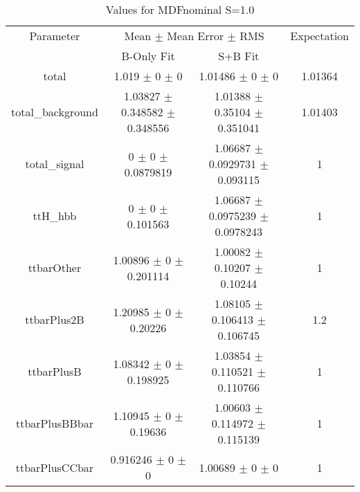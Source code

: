 \begin{table}
\centering
\caption{Values for MDFnominal S=1.0}
\begin{tabular}{cccc}
\toprule
Parameter & \multicolumn{2}{c}{Mean $\pm$ Mean Error $\pm$ RMS} & Expectation\\
 & B-Only Fit & S+B Fit & \\
\midrule
total & \num{1.019} $\pm$ \num{0} $\pm$ \num{0} & \num{1.01486} $\pm$ \num{0} $\pm$ \num{0} & \num{1.01364}\\
total\_background & \num{1.03827} $\pm$ \num{0.348582} $\pm$ \num{0.348556} & \num{1.01388} $\pm$ \num{0.35104} $\pm$ \num{0.351041} & \num{1.01403}\\
total\_signal & \num{0} $\pm$ \num{0} $\pm$ \num{0.0879819} & \num{1.06687} $\pm$ \num{0.0929731} $\pm$ \num{0.093115} & \num{1}\\
ttH\_hbb & \num{0} $\pm$ \num{0} $\pm$ \num{0.101563} & \num{1.06687} $\pm$ \num{0.0975239} $\pm$ \num{0.0978243} & \num{1}\\
ttbarOther & \num{1.00896} $\pm$ \num{0} $\pm$ \num{0.201114} & \num{1.00082} $\pm$ \num{0.10207} $\pm$ \num{0.10244} & \num{1}\\
ttbarPlus2B & \num{1.20985} $\pm$ \num{0} $\pm$ \num{0.20226} & \num{1.08105} $\pm$ \num{0.106413} $\pm$ \num{0.106745} & \num{1.2}\\
ttbarPlusB & \num{1.08342} $\pm$ \num{0} $\pm$ \num{0.198925} & \num{1.03854} $\pm$ \num{0.110521} $\pm$ \num{0.110766} & \num{1}\\
ttbarPlusBBbar & \num{1.10945} $\pm$ \num{0} $\pm$ \num{0.19636} & \num{1.00603} $\pm$ \num{0.114972} $\pm$ \num{0.115139} & \num{1}\\
ttbarPlusCCbar & \num{0.916246} $\pm$ \num{0} $\pm$ \num{0} & \num{1.00689} $\pm$ \num{0} $\pm$ \num{0} & \num{1}\\
\bottomrule
\end{tabular}
\end{table}